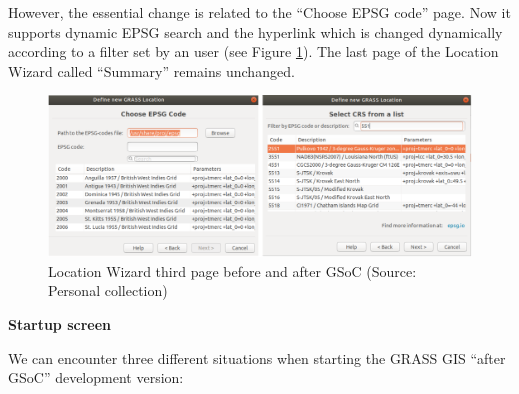 \documentclass[a4paper,10pt,twoside]{article}
\begin{document}
\noindent  However, the essential change is related to the ``Choose
EPSG code'' page. Now it supports dynamic EPSG search and the
hyperlink which is changed dynamically according to a filter set by an
user (see Figure \ref{fig:loc_wiz_3}). The last page of the Location
Wizard called ``Summary'' remains unchanged.

\begin{figure}[hbt!] 
\begin{center}
\includegraphics[width=17cm]{../pictures/loc_wiz_3.png} 
\caption[Location Wizard third page before and after GSoC)]{Location Wizard third page before and after GSoC (Source: Personal collection)}
\label{fig:loc_wiz_3}
\end{center}
\end{figure}

\bigskip
\noindent \textbf {Startup screen}

\noindent We can encounter three different situations when starting
the GRASS GIS ``after GSoC'' development version:
\end{document}
